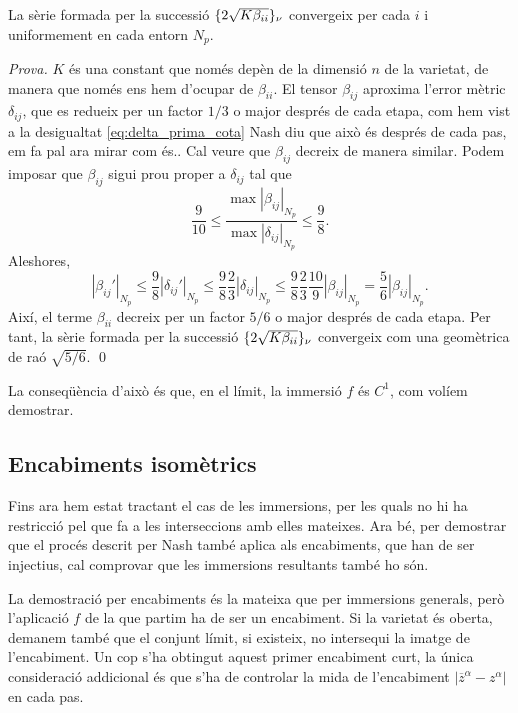 \begin{prop}
    La sèrie formada per la successió $\{2\sqrt{K\beta_{ii}}\}_{\nu}$ convergeix per cada $i$ i uniformement en cada entorn $N_p$.
\end{prop}
{
\color{green!50!black} \textit{Prova.} 
$K$ és una constant que només depèn de la dimensió $n$ de la varietat, de manera que només ens hem d'ocupar de $\beta_{ii}$.
El tensor $\beta_{ij}$ aproxima l'error mètric $\delta_{ij}$, que es redueix per un factor $1/3$ o major després de cada etapa, com hem vist a la desigualtat \ref{eq:delta_prima_cota} {\color{blue} Nash diu que això és després de cada pas, em fa pal ara mirar com és.}. Cal veure que $\beta_{ij}$ decreix de manera similar. Podem imposar que $\beta_{ij}$ sigui prou proper a $\delta_{ij}$ tal que 
\begin{equation}
    \frac{9}{10} \le \frac{\max|\beta_{ij}|_{N_p}}{\max|\delta_{ij}|_{N_p}} \le \frac{9}{8}.
\end{equation}
Aleshores,
\begin{equation}
    |\beta_{ij}'|_{N_p} \le \frac{9}{8}|\delta_{ij}'|_{N_p}\le \frac{9}{8}\frac{2}{3}|\delta_{ij}|_{N_p} \le \frac{9}{8}\frac{2}{3}\frac{10}{9}|\beta_{ij}|_{N_p} =  \frac{5}{6}|\beta_{ij}|_{N_p}.
\end{equation}
Així, el terme $\beta_{ii}$ decreix per un factor $5/6$ o major després de cada etapa. Per tant, la sèrie formada per la successió $\{2\sqrt{K\beta_{ii}}\}_{\nu}$ convergeix com una geomètrica de raó $\sqrt{5/6}$. \qed
}

\begin{obs}
    La conseqüència d'això és que, en el límit, la immersió $f$ és $C^1$, com volíem demostrar.
\end{obs}

\subsection{Encabiments isomètrics}

Fins ara hem estat tractant el cas de les immersions, per les quals no hi ha restricció pel que fa a les interseccions amb elles mateixes. Ara bé, per demostrar que el procés descrit per Nash també aplica als encabiments, que han de ser injectius, cal comprovar que les immersions resultants també ho són.

La demostració per encabiments és la mateixa que per immersions generals, però l'aplicació $f$ de la que partim ha de ser un encabiment. Si la varietat és oberta, demanem també que el conjunt límit, si existeix, no intersequi la imatge de l'encabiment. Un cop s'ha obtingut aquest primer encabiment curt, la única consideració addicional és que s'ha de controlar la mida de l'encabiment $|\overline z^\alpha - z^\alpha|$ en cada pas.

